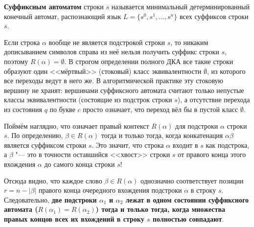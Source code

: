 \begin{definition}
    \textbf{Суффиксным автоматом} строки $s$ называется минимальный детерминированный конечный автомат, распознающий язык $L = \{s^0, s^1, \dots, s^n\}$ всех суффиксов строки $s$.
\end{definition}

\begin{note}
    Если строка $\alpha$ вообще не является подстрокой строки $s$, то никаким дописыванием символов справа из неё нельзя получить суффикс строки $s$, поэтому $R(\alpha) = \emptyset$. В строгом определении полного ДКА все такие строки образуют один <<мёртвый>> (стоковый) класс эквивалентности $\emptyset$, из которого все переходы ведут в него же. В алгоритмической практике эту стоковую вершину не хранят: вершинами суффиксного автомата считают только непустые классы эквивалентности (состоящие из подстрок строки $s$), а отсутствие перехода из состояния $q$ по букве $c$ просто означает, что переход вёл бы в пустой класс $\emptyset$.
\end{note}

Поймём наглядно, что означает правый контекст $R(\alpha)$ для подстроки $\alpha$ строки $s$. По определению, $\beta \in R(\alpha)$ тогда и только тогда, когда конкатенация $\alpha\beta$ является суффиксом строки $s$. Это значит, что строка $\alpha$ входит в $s$ как подстрока, а $\beta$ "--- это в точности оставшийся <<хвост>> строки $s$ от правого конца этого вхождения $\alpha$ до самого конца строки $s$!

\begin{center}
\end{center}

Отсюда видно, что каждое слово $\beta \in R(\alpha)$ однозначно соответствует позиции $r = n - |\beta|$ правого конца очередного вхождения подстроки $\alpha$ в строку $s$. Следовательно, \textbf{две подстроки $\alpha_1$ и $\alpha_2$ лежат в одном состоянии суффиксного автомата ($R(\alpha_1) = R(\alpha_2)$) тогда и только тогда, когда множества правых концов всех их вхождений в строку $s$ полностью совпадают}.

